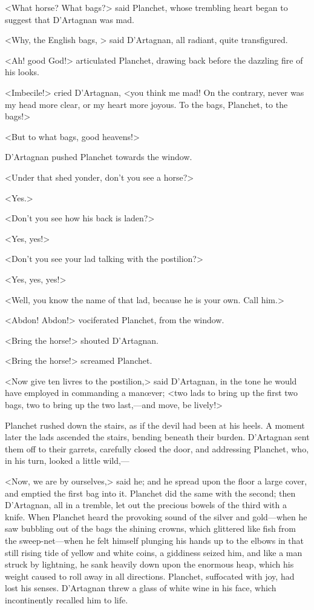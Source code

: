 <What horse? What bags?> said Planchet, whose trembling heart began to suggest that D'Artagnan was mad.

<Why, the English bags, > said D'Artagnan, all radiant, quite transfigured.

<Ah! good God!> articulated Planchet, drawing back before the dazzling fire of his looks.

<Imbecile!> cried D'Artagnan, <you think me mad!  On the contrary, never was my head more clear, or my heart more joyous. To the bags, Planchet, to the bags!>

<But to what bags, good heavens!>

D'Artagnan pushed Planchet towards the window.

<Under that shed yonder, don't you see a horse?>

<Yes.>

<Don't you see how his back is laden?>

<Yes, yes!>

<Don't you see your lad talking with the postilion?>

<Yes, yes, yes!>

<Well, you know the name of that lad, because he is your own. Call him.>

<Abdon! Abdon!> vociferated Planchet, from the window.

<Bring the horse!> shouted D'Artagnan.

<Bring the horse!> screamed Planchet.

<Now give ten livres to the postilion,> said D'Artagnan, in the tone he would have employed in commanding a manœver; <two lads to bring up the first two bags, two to bring up the two last,—and move,  be lively!>

Planchet rushed down the stairs, as if the devil had been at his heels. A moment later the lads ascended the stairs, bending beneath their burden. D'Artagnan sent them off to their garrets, carefully closed the door, and addressing Planchet, who, in his turn, looked a little wild,—

<Now, we are by ourselves,> said he; and he spread upon the floor a large cover, and emptied the first bag into it. Planchet did the same with the second; then D'Artagnan, all in a tremble, let out the precious bowels of the third with a knife. When Planchet heard the provoking sound of the silver and gold—when he saw bubbling out of the bags the shining crowns, which glittered like fish from the sweep-net—when he felt himself plunging his hands up to the elbows in that still rising tide of yellow and white coins, a giddiness seized him, and like a man struck by lightning, he sank heavily down upon the enormous heap, which his weight caused to roll away in all directions. Planchet, suffocated with joy, had lost his senses. D'Artagnan threw a glass of white wine in his face, which incontinently recalled him to life.


